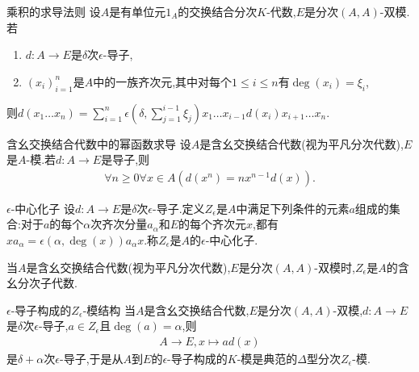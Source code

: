 \begin{proposition}{乘积的求导法则}{}
	设$A$是有单位元$1_{A}$的交换结合分次$K$-代数,$E$是分次$\left(A,A\right)$-双模.若
	\begin{enumerate}
		\item $d:A\to E$是$\delta$次$\epsilon$-导子,
		\item $\left(x_{i}\right)_{i=1}^{n}$是$A$中的一族齐次元,其中对每个$1\leq i\leq n$有$\deg\left(x_{i}\right)=\xi_{i}$,
	\end{enumerate}
	则$d\left(x_{1}\ldots x_{n}\right)=\sum\limits_{i=1}^{n}\epsilon\left(\delta,\sum\limits_{j=1}^{i-1}\xi_{j}\right)x_{1}\ldots x_{i-1}d\left(x_{i}\right)x_{i+1}\ldots x_{n}$.
\end{proposition}

\begin{corollary}{含幺交换结合代数中的幂函数求导}{}
	设$A$是含幺交换结合代数(视为平凡分次代数),$E$是$A$-模.若$d:A\to E$是导子,则
	\begin{align*}
		\forall n\geq 0\forall x\in A\left(d\left(x^{n}\right)=nx^{n-1}d\left(x\right)\right).
	\end{align*}
\end{corollary}

\begin{definition}{$\epsilon$-中心化子}{}
	设$d:A\to E$是$\delta$次$\epsilon$-导子.定义$Z_{\epsilon}$是$A$中满足下列条件的元素$a$组成的集合:对于$a$的每个$\alpha$次齐次分量$a_{\alpha}$和$E$的每个齐次元$x$,都有$xa_{\alpha}=\epsilon\left(\alpha,\deg\left(x\right)\right)a_{\alpha}x$.称$Z_{\epsilon}$是$A$的$\epsilon$-中心化子.
\end{definition}

\begin{remark}{}{}
	当$A$是含幺交换结合代数(视为平凡分次代数),$E$是分次$\left(A,A\right)$-双模时,$Z_{\epsilon}$是$A$的含幺分次子代数.
\end{remark}

\begin{proposition}{$\epsilon$-导子构成的$Z_{\epsilon}$-模结构}{}
	当$A$是含幺交换结合代数,$E$是分次$\left(A,A\right)$-双模,$d:A\to E$是$\delta$次$\epsilon$-导子,$a\in Z_{\epsilon}$且$\deg\left(a\right)=\alpha$,则
	\begin{align*}
		A\to E,x\mapsto ad\left(x\right)
	\end{align*}
	是$\delta+\alpha$次$\epsilon$-导子,于是从$A$到$E$的$\epsilon$-导子构成的$K$-模是典范的$\Delta$型分次$Z_{\epsilon}$-模.
\end{proposition}
















